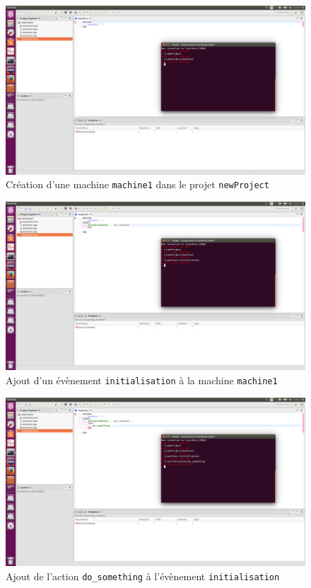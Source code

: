 \begin{figure}[H]
    \centering
    \includegraphics{pictures/rodinCommunication3.png}
    \caption{Création d'une machine \texttt{machine1} dans le projet \texttt{newProject}}
    \label{fig:rodinCommunication3}
\end{figure}

\begin{figure}[H]
    \centering
    \includegraphics{pictures/rodinCommunication4.png}
    \caption{Ajout d'un évènement \texttt{initialisation} à la machine \texttt{machine1}}
    \label{fig:rodinCommunication4}
\end{figure}

\begin{figure}[H]
    \centering
    \includegraphics{pictures/rodinCommunication5.png}
    \caption{Ajout de l'action \texttt{do\_something} à l'évènement \texttt{initialisation}}
    \label{fig:rodinCommunication5}
\end{figure}

